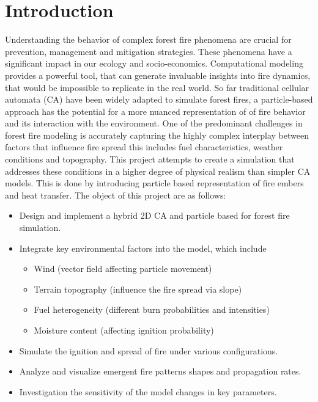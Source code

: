 \section{Introduction}
Understanding the behavior of complex forest fire phenomena are crucial for prevention, management and mitigation strategies. These phenomena have a significant impact in our ecology and socio-economics. Computational modeling provides a powerful tool, that can generate invaluable insights into fire dynamics, that would be impossible to replicate in the real world. So far traditional cellular automata (CA) have been widely adapted to simulate forest fires, a particle-based approach has the potential for a more nuanced representation of of fire behavior and its interaction with the environment.\newline
\newline
One of the predominant challenges in forest fire modeling is accurately capturing the highly complex interplay between factors that influence fire spread this includes fuel characteristics, weather conditions and topography. This project attempts to create a simulation that addresses these conditions in a higher degree of physical realism than simpler CA models. This is done by introducing particle based representation of fire embers and heat transfer.\newline
\newline
The object of this project are as follows:
\begin{itemize}
	\item Design and implement a hybrid 2D CA and particle based for forest fire simulation.
	\item Integrate key environmental factors into the model, which include
		\begin{itemize}
			\item Wind (vector field affecting particle movement)
			\item Terrain topography (influence the fire spread via slope)
			\item Fuel heterogeneity (different burn probabilities and intensities)
			\item Moisture content (affecting ignition probability)
		\end{itemize}
	\item Simulate the ignition and spread of fire under various configurations.
	\item Analyze and visualize emergent fire patterns shapes and propagation rates.
	\item Investigation the sensitivity of the model changes in key parameters.
\end{itemize}
